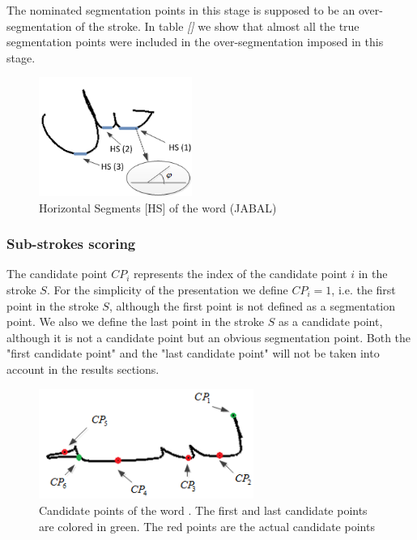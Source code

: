 \documentclass[journal,compsoc]{IEEEtran}
\begin{document}
The nominated segmentation points in this stage is supposed to be an over-segmentation of the stroke. In table \emph{[]} we show that almost all the true segmentation points were included in the over-segmentation imposed in this stage. 


\begin{figure}
\centering
\includegraphics[width=5cm]{./figures/horizontal_segments}
\caption{Horizontal Segments [HS] of the word (JABAL)}
\label{fig:horizontal_segments}
\end{figure}

\subsubsection{Sub-strokes scoring}
The candidate point $CP_{i}$ represents the index of the candidate point $i$ in the stroke $S$. For the simplicity of the presentation we define $CP_{i}=1$, i.e. the first point in the stroke $S$, although the first point is not defined as a segmentation point. We also we define the last point in the stroke $S$ as a candidate point, although it is not a candidate point but an obvious segmentation point. Both the "first candidate point" and the "last candidate point" will not be taken into account in the results sections.   

\begin{figure}
\centering
\includegraphics[width=7cm]{./figures/candidate_points}
\caption{Candidate points of the word  . The first and last candidate points are colored in green. The red points are the actual candidate points}
\label{fig:candidate_points}
\end{figure}
\end{document}
